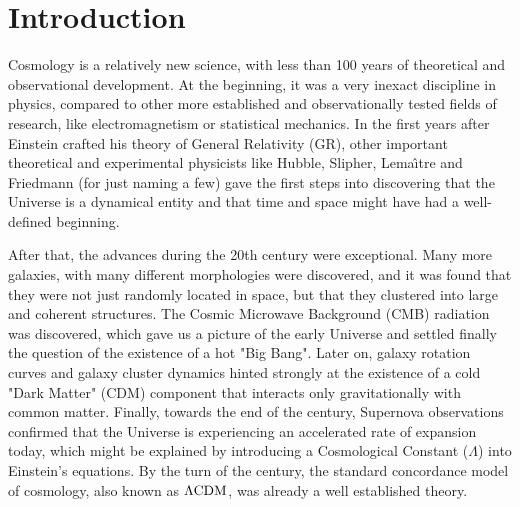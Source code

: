 \chapter*{Introduction \label{IntroIntro}} %






Cosmology is a relatively new science, with less than 100 years of theoretical and observational development.
At the beginning, it was a very inexact discipline in physics, compared to other more established and observationally tested fields of research, like electromagnetism or statistical mechanics.
In the first years after Einstein crafted his theory of General Relativity (GR), other important theoretical and experimental physicists like Hubble, Slipher, Lema\^{\i}tre and Friedmann (for just naming a few) gave the first steps into discovering
that the Universe is a dynamical entity and that time and space might have had a well-defined beginning.

After that, the advances during the 20th century were exceptional. Many more galaxies, with many different morphologies were discovered,
and it was found that they were not just randomly located in space, but that they clustered into large and coherent structures. The Cosmic Microwave Background (CMB) radiation was discovered, which gave us a picture of the early Universe and settled finally the question of the existence of a hot "Big Bang". Later on, galaxy rotation curves and galaxy cluster dynamics hinted strongly at the existence of a cold "Dark Matter" (CDM) component that interacts only gravitationally with common matter. Finally, towards the end of the century, Supernova observations confirmed that the Universe 
is experiencing an accelerated rate of expansion today, which might be explained
by introducing a Cosmological Constant ($\Lambda$) into Einstein's equations. 
By the turn of the century, the standard concordance
model of cosmology, also known as $\Lambda\mathrm{CDM}$, was already a well established theory.

